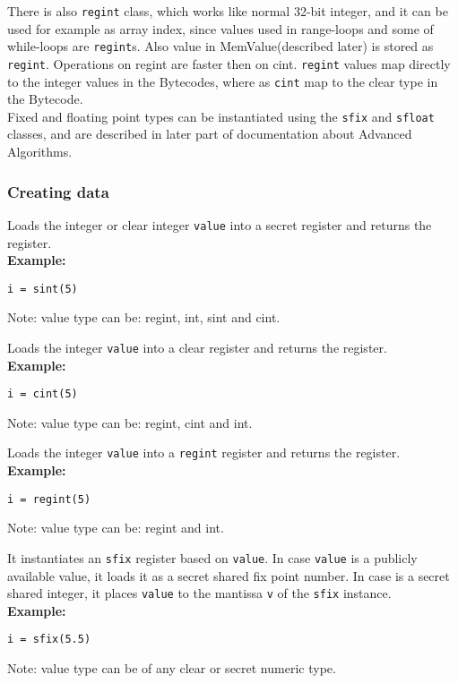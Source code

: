 There is also \verb|regint| class, which works like normal 32-bit integer, and it can be used for example as array index, since values used in range-loops and some of while-loops are \verb|regint|s. Also value in MemValue(described later) is stored as \verb|regint|. Operations on regint are faster then on cint.
\verb+regint+ values map directly to the integer values in the Bytecodes,
where as \verb+cint+ map to the clear type in the Bytecode.
 \\

Fixed and floating point types can be instantiated using the \verb|sfix| and \verb|sfloat| classes, and are described in later part of documentation about Advanced Algorithms.

\subsubsection{Creating data}


Loads the integer or clear integer \verb|value| into a secret register and returns the register.\\
\textbf{Example:}
\begin{lstlisting}
i = sint(5)
\end{lstlisting}
\begin{footnotesize}
Note: value type can be: regint, int, sint and cint.
\end{footnotesize}

Loads the integer \verb|value| into a clear register and returns the register.\\
\textbf{Example:}
\begin{lstlisting}
i = cint(5)
\end{lstlisting}
\begin{footnotesize}
Note: value type can be: regint, cint and int.
\end{footnotesize}

Loads the integer \verb|value| into a \verb|regint| register and returns 
the register.\\
\textbf{Example:}
\begin{lstlisting}
i = regint(5)
\end{lstlisting}
\begin{footnotesize}
Note: value type can be: regint and int.
\end{footnotesize}

It instantiates  an \verb|sfix| register based on \verb|value|. In case \verb|value| is a publicly available value, it loads it as a secret shared fix point number. In case is a secret shared integer, it places \verb|value| to the mantissa \verb|v| of the \verb|sfix| instance. 
\\
\textbf{Example:}
\begin{lstlisting}
i = sfix(5.5)
\end{lstlisting}
\begin{footnotesize}
Note: value type can be of any clear or secret numeric type.
\end{footnotesize}


